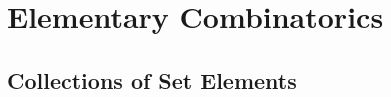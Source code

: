 \section{Elementary Combinatorics} 


\subsection{Collections of Set Elements} 


\begin{comment}



\end{comment}

